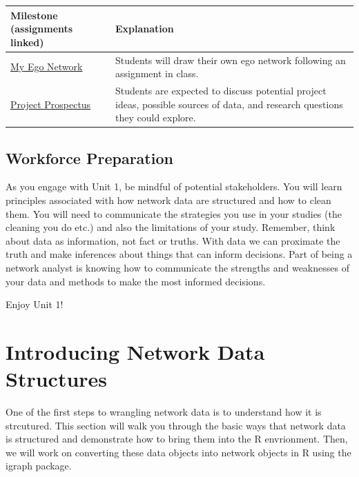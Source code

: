 \documentclass[
  letterpaper,
  DIV=11,
  numbers=noendperiod]{scrreprt}
\begin{document}
\begin{longtable}[]{@{}
  >{\raggedright\arraybackslash}p{}
  >{\raggedright\arraybackslash}p{}@{}}
\toprule\noalign{}
\begin{minipage}[b]{\linewidth}\raggedright
Milestone (assignments linked)
\end{minipage} & \begin{minipage}[b]{\linewidth}\raggedright
Explanation
\end{minipage} \\
\midrule\noalign{}
\endhead
\bottomrule\noalign{}
\endlastfoot
\href{A1_My\%20Ego\%20Network.qmd}{My Ego Network} & Students will draw
their own ego network following an assignment in class. \\
\href{A2_Project\%20Prospectus.qmd}{Project Prospectus} & Students are
expected to discuss potential project ideas, possible sources of data,
and research questions they could explore. \\
\end{longtable}

\section{Workforce Preparation}\label{workforce-preparation}

As you engage with Unit 1, be mindful of potential stakeholders. You
will learn principles associated with how network data are structured
and how to clean them. You will need to communicate the strategies you
use in your studies (the cleaning you do etc.) and also the limitations
of your study. Remember, think about data as information, not fact or
truths. With data we can proximate the truth and make inferences about
things that can inform decisions. Part of being a network analyst is
knowing how to communicate the strengths and weaknesses of your data and
methods to make the most informed decisions.

Enjoy Unit 1!

\chapter{Introducing Network Data
Structures}\label{introducing-network-data-structures}

One of the first steps to wrangling network data is to understand how it
is strcutured. This section will walk you through the basic ways that
network data is structured and demonstrate how to bring them into the R
envrionment. Then, we will work on converting these data objects into
network objects in R using the igraph package.
\end{document}
